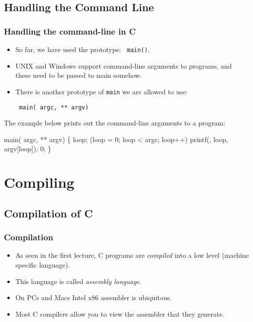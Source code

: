 \documentclass[smaller,table]{beamer} %
\begin{document}
\subsection{Handling the Command Line}
\begin{frame}[fragile]
\frametitle{Handling the command-line in C}
\begin{itemize}
\item So far, we have used the prototype: {\tt {} main()}.
\item UNIX and Windows support command-line arguments to programs, and these need to be passed to main somehow.
\item There is another prototype of {\tt main} we are allowed to use:\\
\begin{center}
\tt {} main( argc,  ** argv)
\end{center}
\end{itemize}
The example below prints out the command-line arguments to a program:
\vspace{-0.1in}
\begin{semiverbatim}
\small
{} 

 main( argc,  ** argv)
\{
    loop;
    (loop = 0; loop < argc; loop++)
      printf(, loop, argv[loop]);
    0;
\}
\end{semiverbatim}
\end{frame}



\section{Compiling}
\subsection{Compilation of C}
\begin{frame}
\frametitle{Compilation}
\begin{itemize}
\item As seen in the first lecture, C programs are \emph{compiled} into a low level (machine specific language).
\item This language is called \emph{assembly language}.
\item On PCs and Macs Intel x86 assembler is ubiquitous.
\item Most C compilers allow you to view the assembler that they generate.
\end{itemize}
\end{frame}
\end{document}

